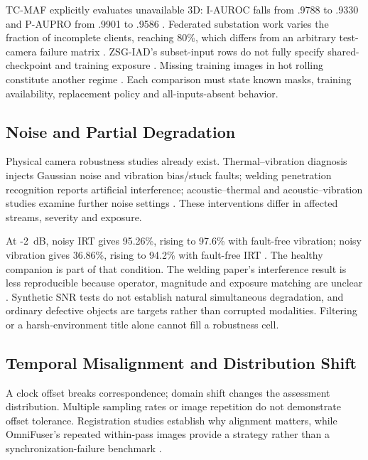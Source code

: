 TC-MAF explicitly evaluates unavailable 3D: I-AUROC falls from .9788 to .9330 and P-AUPRO from .9901 to .9586 \citep[PDF p.~7, Table~3]{P026}. Federated substation work varies the fraction of incomplete clients, reaching 80\%, which differs from an arbitrary test-camera failure matrix \citep[PDF p.~29, Figure~8]{P051}. ZSG-IAD's subset-input rows do not fully specify shared-checkpoint and training exposure \citep{P025}. Missing training images in hot rolling constitute another regime \citep{Ma2025A}. Each comparison must state known masks, training availability, replacement policy and all-inputs-absent behavior.

\subsection{Noise and Partial Degradation}
Physical camera robustness studies already exist. Thermal--vibration diagnosis injects Gaussian noise and vibration bias/stuck faults; welding penetration recognition reports artificial interference; acoustic--thermal and acoustic--vibration studies examine further noise settings \citep{Huo2022Multisensor,Hua2026Weld,Ying2025Trustworthy,Huang2026Rolling}. These interventions differ in affected streams, severity and exposure.

At -2~dB, noisy IRT gives 95.26\%, rising to 97.6\% with fault-free vibration; noisy vibration gives 36.86\%, rising to 94.2\% with fault-free IRT \citep[PDF p.~7, Table~VIII]{Huo2022Multisensor}. The healthy companion is part of that condition. The welding paper's interference result is less reproducible because operator, magnitude and exposure matching are unclear \citep{Hua2026Weld}. Synthetic SNR tests do not establish natural simultaneous degradation, and ordinary defective objects are targets rather than corrupted modalities. Filtering or a harsh-environment title alone cannot fill a robustness cell.

\subsection{Temporal Misalignment and Distribution Shift}
A clock offset breaks correspondence; domain shift changes the assessment distribution. Multiple sampling rates or image repetition do not demonstrate offset tolerance. Registration studies establish why alignment matters, while OmniFuser's repeated within-pass images provide a strategy rather than a synchronization-failure benchmark \citep{Petrich2021Multimodal,Chen2023Multisensor,P021}.

